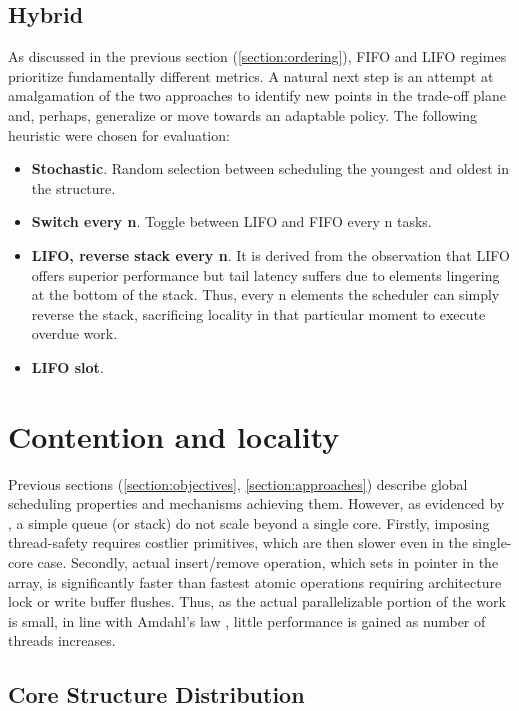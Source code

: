 \documentclass[12pt,a4paper,twoside]{report}
\begin{document}
\subsection{Hybrid}
As discussed in the previous section (\ref{section:ordering}), FIFO and LIFO regimes prioritize fundamentally different metrics. A natural next step is an attempt at amalgamation of the two approaches to identify new points in the trade-off plane and, perhaps, generalize or move towards an adaptable policy. The following heuristic were chosen for evaluation: 


\begin{itemize}
    \item \textbf{Stochastic}. Random selection between scheduling the youngest and oldest in the structure. 
    \item \textbf{Switch every n}. Toggle between LIFO and FIFO every n tasks.
    \item \textbf{LIFO, reverse stack every n}. It is derived from the observation that LIFO offers superior performance but tail latency suffers due to elements lingering at the bottom of the stack. Thus, every n elements the scheduler can simply reverse the stack, sacrificing locality in that particular moment to execute overdue work.    
    \item \textbf{LIFO slot}. 
\end{itemize}


\section{Contention and locality}
\label{section:global_local}


Previous sections (\ref{section:objectives}, \ref{section:approaches}) describe global scheduling properties and mechanisms achieving them. However, as evidenced by , a simple queue (or stack) do not scale beyond a single core. Firstly, imposing thread-safety requires costlier primitives, which are then slower even in the single-core case.
Secondly, actual insert/remove operation, which sets in pointer in the array, is significantly faster than fastest atomic operations requiring architecture lock or write buffer flushes. Thus, as the actual parallelizable portion of the work is small, in line with Amdahl's law \cite{amdahl}, little performance is gained as number of threads increases. 

\subsection{Core Structure Distribution}
\label{section:core_struct_dist}
\end{document}
